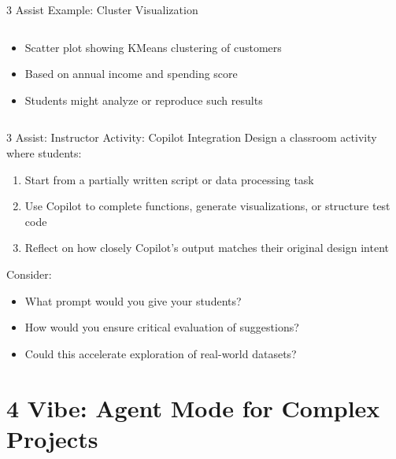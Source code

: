 \documentclass[xcolor={dvipsnames,table}, aspectratio=169]{beamer}
\newcommand{\footername}{AI in Programming Education}
\newcommand{\setfooter}[2]{\renewcommand{\footername}{\href{#2}{#1}}}
\begin{document}
\begin{frame}{3 Assist Example: Cluster Visualization}
\begin{columns}
\begin{column}{0.4\textwidth}
      \begin{itemize}
        \item Scatter plot showing KMeans clustering of customers
        \item Based on annual income and spending score
        \item Students might analyze or reproduce such results
      \end{itemize}
    \end{column}
  \end{columns}
\end{frame}


\begin{frame}{3 Assist: Instructor Activity: Copilot Integration}
  Design a classroom activity where students:
  \begin{enumerate}
    \item Start from a partially written script or data processing task
    \item Use Copilot to complete functions, generate visualizations, or structure test code
    \item Reflect on how closely Copilot's output matches their original design intent
  \end{enumerate}
  
  Consider:
  \begin{itemize}
    \item What prompt would you give your students?
    \item How would you ensure critical evaluation of suggestions?
    \item Could this accelerate exploration of real-world datasets?
  \end{itemize}
\end{frame}

\section{4 Vibe: Agent Mode for Complex Projects}
\setfooter{4 Vibe}{https://github.com/neu-ece-esl/ai-prog-workshop/tree/main/4-vibe}
\end{document}
